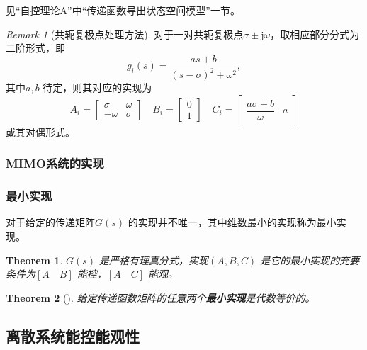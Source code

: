 \documentclass[14pt,a4paper]{article}
\theoremstyle{plain}
\newtheorem{thm}{Theorem}[section]
\theoremstyle{definition}
\theoremstyle{remark}
\newtheorem{rmk}{Remark}[section]
\theoremstyle{plain}
\theoremstyle{plain}
\theoremstyle{plain}
\theoremstyle{definition}
\theoremstyle{remark}
\numberwithin{equation}{section}
\begin{document}
				见``自控理论A''中``传递函数导出状态空间模型''一节。

				\begin{rmk}[共轭复极点处理方法]  
				\label{rmk:共轭复极点处理方法}
					对于一对共轭复极点$\sigma\pm \mathrm{j} \omega $，取相应部分分式为二阶形式，即
					\[
						g_{i}(s) = \dfrac{as+b}{(s-\sigma )^2+\omega^2} 
					,\] 
					其中$a,b$ 待定，则其对应的实现为
					\[
					A_{i}=\begin{bmatrix}
						\sigma & \omega\\
						-\omega & \sigma 
					\end{bmatrix} 
					\quad 
					B_{i} = \begin{bmatrix}
						0\\1 
					\end{bmatrix} 
					\quad
					C_{i}=\begin{bmatrix}
						\dfrac{a \sigma+b}{\omega } & a 
					\end{bmatrix} 	
					\]
					或其对偶形式。
				\end{rmk} 
				
			\subsubsection{MIMO系统的实现}%
			\label{ssub:mimo系统的实现}

			\subsubsection{最小实现}%
			\label{ssub:最小实现}
			
			对于给定的传递矩阵$G(s)$ 的实现并不唯一，其中维数最小的实现称为最小实现。 

				\begin{thm}  
				\label{the:822}
				$G(s)$ 是严格有理真分式，实现$\left( A,B,C \right) $ 是它的最小实现的\emph{充要条件}为$\left[ A\quad B \right] $ 能控，$\left[ A\quad C \right] $ 能观。
				\end{thm} 

				\begin{thm}[]  
				\label{the:823}
					给定传递函数矩阵的任意两个\textbf{最小实现}是代数等价的。
				\end{thm} 

		\subsection{离散系统能控能观性}%
		\label{sub:离散系统能控能观性}
		
\end{document}
